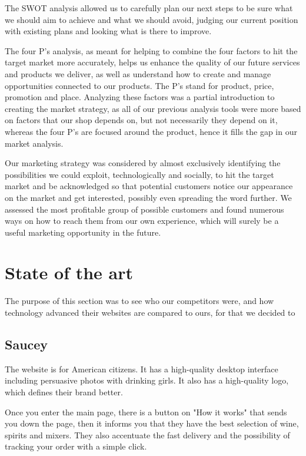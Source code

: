 \documentclass[12p]{article}
\begin{document}
The SWOT analysis allowed us to carefully plan our next steps to be sure what we should aim to achieve and what we should avoid, judging our current position with existing plans and looking what is there to improve. 

The four P’s analysis, as meant for helping to combine the four factors to hit the target market more accurately, helps us enhance the quality of our future services and products we deliver, as well as understand how to create and manage opportunities connected to our products. The P’s stand for product, price, promotion and place. Analyzing these factors was a partial introduction to creating the market strategy, as all of our previous analysis tools were more based on factors that our shop depends on, but not necessarily they depend on it, whereas the four P’s are focused around the product, hence it fills the gap in our market analysis.

Our marketing strategy was considered by almost exclusively identifying the possibilities we could exploit, technologically and socially, to hit the target market and be acknowledged so that potential customers notice our appearance on the market and get interested, possibly even spreading the word further. We assessed the most profitable group of possible customers and found numerous ways on how to reach them from our own experience, which will surely be a useful marketing opportunity in the future.


\newpage
\section{State of the art}

The purpose of this section was to see who our competitors were, and how technology advanced their websites are compared to ours, for that we decided to   

\subsection{Saucey \cite{Saucey}}
The website is for American citizens. It has a high-quality desktop interface including persuasive photos with drinking girls. It also has a high-quality logo, which defines their brand better.

Once you enter the main page, there is a button on "How it works" that sends you down the page, then it informs you that they have the best selection of wine, spirits and mixers. They also accentuate the fast delivery and the possibility of tracking your order with a simple click.
\end{document}
